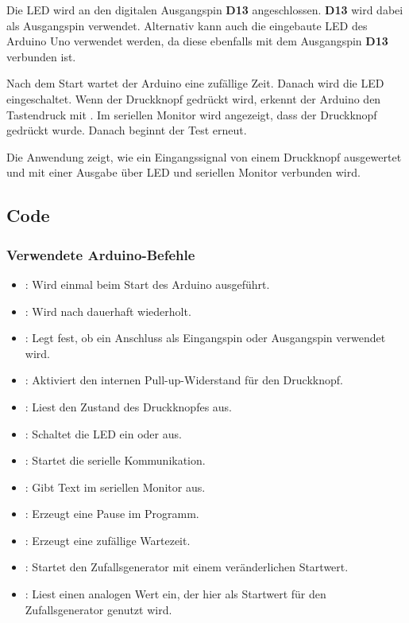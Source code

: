 Die LED wird an den digitalen Ausgangspin \textbf{D13} angeschlossen. \textbf{D13} wird dabei als Ausgangspin verwendet. Alternativ kann auch die eingebaute LED des Arduino Uno verwendet werden, da diese ebenfalls mit dem Ausgangspin \textbf{D13} verbunden ist.

Nach dem Start wartet der Arduino eine zufällige Zeit. Danach wird die LED eingeschaltet. Wenn der Druckknopf gedrückt wird, erkennt der Arduino den Tastendruck mit . Im seriellen Monitor wird angezeigt, dass der Druckknopf gedrückt wurde. Danach beginnt der Test erneut.

Die Anwendung zeigt, wie ein Eingangssignal von einem Druckknopf ausgewertet und mit einer Ausgabe über LED und seriellen Monitor verbunden wird.

\subsection{Code}

{
	\label{lst:ReaktionstestDruckknopf}
}
\subsubsection*{Verwendete Arduino-Befehle}

\begin{itemize}
	\item {}: Wird einmal beim Start des Arduino ausgeführt.
	\item {}: Wird nach  dauerhaft wiederholt.
	\item {}: Legt fest, ob ein Anschluss als Eingangspin oder Ausgangspin verwendet wird.
	\item {}: Aktiviert den internen Pull-up-Widerstand für den Druckknopf.
	\item {}: Liest den Zustand des Druckknopfes aus.
	\item {}: Schaltet die LED ein oder aus.
	\item {}: Startet die serielle Kommunikation.
	\item {}: Gibt Text im seriellen Monitor aus.
	\item {}: Erzeugt eine Pause im Programm.
	\item {}: Erzeugt eine zufällige Wartezeit.
	\item {}: Startet den Zufallsgenerator mit einem veränderlichen Startwert.
	\item {}: Liest einen analogen Wert ein, der hier als Startwert für den Zufallsgenerator genutzt wird.
\end{itemize}

